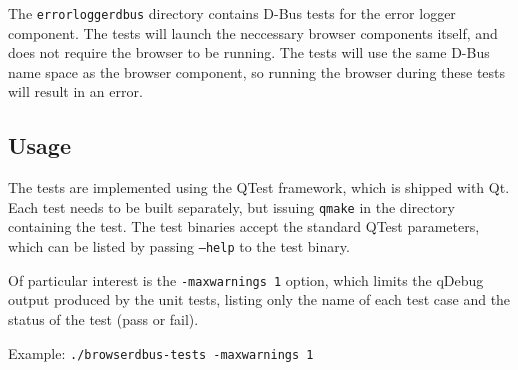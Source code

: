 \documentclass{pelagicore}
\begin{document}
The {\tt errorloggerdbus} directory contains D-Bus tests for the error logger
component. The tests will launch the neccessary browser components itself, and
does not require the browser to be running. The tests will use the same D-Bus
name space as the browser component, so running the browser during these tests
will result in an error.

\subsection{Usage}
The tests are implemented using the QTest framework, which is shipped with Qt.
Each test needs to be built separately, but issuing {\tt qmake} in the
directory containing the test.
The test binaries accept the standard QTest parameters, which can be listed by
passing {\tt ---help} to the test binary.

Of particular interest is the {\tt -maxwarnings 1} option, which limits the
qDebug output produced by the unit tests, listing only the name of each test
case and the status of the test (pass or fail).

Example: {\tt ./browserdbus-tests -maxwarnings 1}
\end{document}
